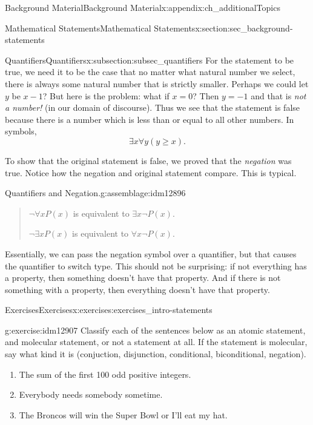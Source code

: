 \documentclass[oneside,10pt,]{book}
\numberwithin{equation}{chapter}
\begin{document}
\begin{appendixptx}{Background Material}{}{Background Material}{}{}{x:appendix:ch_additionalTopics}
\begin{sectionptx}{Mathematical Statements}{}{Mathematical Statements}{}{}{x:section:sec_background-statements}
\begin{subsectionptx}{Quantifiers}{}{Quantifiers}{}{}{x:subsection:subsec_quantifiers}
For the statement to be true, we need it to be the case that no matter what natural number we select, there is always some natural number that is strictly smaller. Perhaps we could let \(y\) be \(x-1\)? But here is the problem: what if \(x = 0\)? Then \(y = -1\) and that is \emph{not a number!} (in our domain of discourse). Thus we see that the statement is false because there is a number which is less than or equal to all other numbers. In symbols,%
\begin{equation*}
\exists x \forall y (y \ge x).
\end{equation*}
%
\par
To show that the original statement is false, we proved that the \emph{negation} was true. Notice how the negation and original statement compare. This is typical.%
\begin{assemblage}{Quantifiers and Negation.}{g:assemblage:idm12896}%
\begin{quote}%
\(\neg \forall x P(x)\) is equivalent to \(\exists x \neg P(x)\).%
\par
\(\neg \exists x P(x)\) is equivalent to \(\forall x \neg P(x)\).%
\end{quote}
\end{assemblage}
Essentially, we can pass the negation symbol over a quantifier, but that causes the quantifier to switch type. This should not be surprising: if not everything has a property, then something doesn't have that property. And if there is not something with a property, then everything doesn't have that property.%
\end{subsectionptx}
%
%
\typeout{************************************************}
\typeout{************************************************}
%
\begin{exercises-subsection}{Exercises}{}{Exercises}{}{}{x:exercises:exercises_intro-statements}
\begin{divisionexercise}{1}{}{}{g:exercise:idm12907}%
Classify each of the sentences below as an atomic statement, and molecular statement, or not a statement at all.  If the statement is molecular, say what kind it is (conjuction, disjunction, conditional, biconditional, negation).%
\begin{enumerate}[label=(\alph*)]
\item{}The sum of the first 100 odd positive integers.%
\item{}Everybody needs somebody sometime.%
\item{}The Broncos will win the Super Bowl or I'll eat my hat.%

\end{enumerate}
\end{divisionexercise}
\end{exercises-subsection}
\end{sectionptx}
\end{appendixptx}
\end{document}
